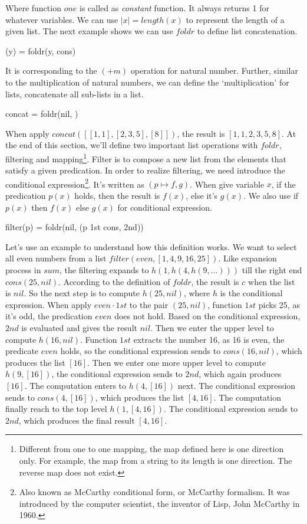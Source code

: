 \documentclass[UTF8]{article}
\begin{document}
Where function $one$ is called as {\em constant} function. It always returns 1 for whatever variables. We can use $|x| = length(x)$ to represent the length of a given list. The next example shows we can use $foldr$ to define list concatenation.

\be
(\doubleplus y) = foldr(y, cons)
\ee

It is corresponding to the $(+m)$ operation for natural number. Further, similar to the multiplication of natural numbers, we can define the `multiplication' for lists, concatenate all sub-lists in a list.

\be
concat = foldr(nil, \doubleplus)
\ee

When apply $concat([[1, 1], [2, 3, 5], [8]])$, the result is $[1, 1, 2, 3, 5, 8]$. At the end of this section, we'll define two important list operations with $foldr$, filtering and mapping\footnote{Different from one to one mapping, the map defined here is one direction only. For example, the map from a string to its length is one direction. The reverse map does not exist.}. Filter is to compose a new list from the elements that satisfy a given predication. In order to realize filtering, we need introduce the conditional expression\footnote{Also known as McCarthy conditional form, or McCarthy formalism. It was introduced by the computer scientist, the inventor of Lisp, John McCarthy in 1960.}. It's written as $(p \mapsto f, g)$. When give variable $x$, if the predication $p(x)$ holds, then the result is $f(x)$, else it's $g(x)$. We also use if $p(x)$ then $f(x)$ else $g(x)$ for conditional expression.

\be
filter(p) = foldr(nil, (p \cdot 1st \mapsto cons, 2nd))
\ee

Let's use an example to understand how this definition works. We want to select all even numbers from a list $filter(even, [1, 4, 9, 16, 25])$. Like expansion process in $sum$, the filtering expands to $h(1, h(4, h(9, ...)))$ till the right end $cons(25, nil)$. According to the definition of $foldr$, the result is $c$ when the list is $nil$. So the next step is to compute $h(25, nil)$, where $h$ is the conditional expression. When apply $even \cdot 1st$ to the pair $(25, nil)$, function $1st$ picks 25, as it's odd, the predication $even$ does not hold. Based on the conditional expression, $2nd$ is evaluated and gives the result $nil$. Then we enter the upper level to compute $h(16, nil)$. Function $1st$ extracts the number 16, as 16 is even, the predicate $even$ holds, so the conditional expression sends to $cons(16, nil)$, which produces the list $[16]$. Then we enter one more upper level to compute $h(9, [16])$, the conditional expression sends to $2nd$, which again produces $[16]$. The computation enters to $h(4, [16])$ next. The conditional expression sends to $cons(4, [16])$, which produces the list $[4, 16]$. The computation finally reach to the top level $h(1, [4, 16])$. The conditional expression sends to $2nd$, which produces the final result $[4, 16]$.
\end{document}
